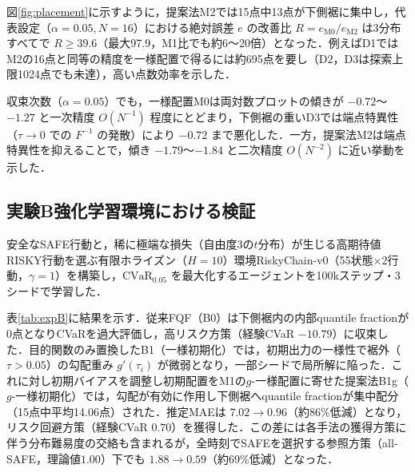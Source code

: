\documentclass[a4paper,twocolumn,10pt]{jsarticle}
\newcommand{\CVaR}{\mathrm{CVaR}}
\begin{document}
図\ref{fig:placement}に示すように，提案法M2では15点中13点が下側裾に集中し，代表設定（$\alpha=0.05, N=16$）における絶対誤差 $e$ の改善比 $R = e_{\mathrm{M0}}/e_{\mathrm{M2}}$ は3分布すべてで $R\ge 39.6$（最大97.9，M1比でも約6〜20倍）となった．例えばD1ではM2の16点と同等の精度を一様配置で得るには約695点を要し（D2，D3は探索上限1024点でも未達），高い点数効率を示した．

収束次数（$\alpha=0.05$）でも，一様配置M0は両対数プロットの傾きが $-0.72$〜$-1.27$ と一次精度 $O(N^{-1})$ 程度にとどまり，下側裾の重いD3では端点特異性（$\tau\to0$ での $F^{-1}$ の発散）により $-0.72$ まで悪化した．一方，提案法M2は端点特異性を抑えることで，傾き $-1.79$〜$-1.84$ と二次精度 $O(N^{-2})$ に近い挙動を示した．

\vspace{-2pt}
\subsection{実験B\quad 強化学習環境における検証}
\vspace{-1pt}
安全なSAFE行動と，稀に極端な損失（自由度3の$t$分布）が生じる高期待値RISKY行動を選ぶ有限ホライズン（$H=10$）環境RiskyChain-v0（55状態$\times$2行動，$\gamma=1$）を構築し，$\CVaR_{0.05}$ を最大化するエージェントを100kステップ・3シードで学習した．

表\ref{tab:expB}に結果を示す．従来FQF（B0）は下側裾内の内部quantile fractionが0点となりCVaRを過大評価し，高リスク方策（経験CVaR $-10.79$）に収束した．目的関数のみ置換したB1（一様初期化）では，初期出力の一様性で裾外（$\tau>0.05$）の勾配重み $g'(\tau_i)$ が微弱となり，一部シードで局所解に陥った．これに対し初期バイアスを調整し初期配置をM1の$g$-一様配置に寄せた提案法B1g（$g$-一様初期化）では，勾配が有効に作用し下側裾へquantile fractionが集中配分（15点中平均14.06点）された．推定MAEは $7.02\to0.96$（約86\%低減）となり，リスク回避方策（経験CVaR $0.70$）を獲得した．この差には各手法の獲得方策に伴う分布難易度の交絡も含まれるが，全時刻でSAFEを選択する参照方策（all-SAFE，理論値$1.00$）下でも $1.88\to0.59$（約69\%低減）となった．
\end{document}
